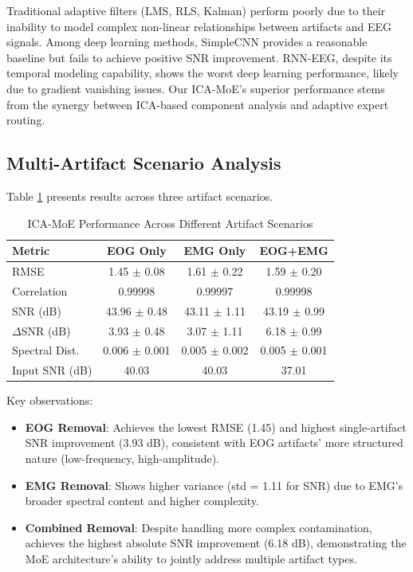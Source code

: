 \documentclass{article}
\begin{document}
Traditional adaptive filters (LMS, RLS, Kalman) perform poorly due to their inability to model complex non-linear relationships between artifacts and EEG signals. Among deep learning methods, SimpleCNN provides a reasonable baseline but fails to achieve positive SNR improvement. RNN-EEG, despite its temporal modeling capability, shows the worst deep learning performance, likely due to gradient vanishing issues. Our ICA-MoE's superior performance stems from the synergy between ICA-based component analysis and adaptive expert routing.

\subsection{Multi-Artifact Scenario Analysis}

Table \ref{tab:scenario_results} presents results across three artifact scenarios.

\begin{table}[!t]
\centering
\caption{ICA-MoE Performance Across Different Artifact Scenarios}
\label{tab:scenario_results}
\begin{tabular}{lccc}
\toprule
\textbf{Metric} & \textbf{EOG Only} & \textbf{EMG Only} & \textbf{EOG+EMG} \\
\midrule
RMSE & 1.45 $\pm$ 0.08 & 1.61 $\pm$ 0.22 & 1.59 $\pm$ 0.20 \\
Correlation & 0.99998 & 0.99997 & 0.99998 \\
SNR (dB) & 43.96 $\pm$ 0.48 & 43.11 $\pm$ 1.11 & 43.19 $\pm$ 0.99 \\
$\Delta$SNR (dB) & 3.93 $\pm$ 0.48 & 3.07 $\pm$ 1.11 & 6.18 $\pm$ 0.99 \\
Spectral Dist. & 0.006 $\pm$ 0.001 & 0.005 $\pm$ 0.002 & 0.005 $\pm$ 0.001 \\
\midrule
Input SNR (dB) & 40.03 & 40.03 & 37.01 \\
\bottomrule
\end{tabular}
\end{table}

Key observations:
\begin{itemize}
\item \textbf{EOG Removal}: Achieves the lowest RMSE (1.45) and highest single-artifact SNR improvement (3.93 dB), consistent with EOG artifacts' more structured nature (low-frequency, high-amplitude).
\item \textbf{EMG Removal}: Shows higher variance (std = 1.11 for SNR) due to EMG's broader spectral content and higher complexity.
\item \textbf{Combined Removal}: Despite handling more complex contamination, achieves the highest absolute SNR improvement (6.18 dB), demonstrating the MoE architecture's ability to jointly address multiple artifact types.
\end{itemize}
\end{document}
